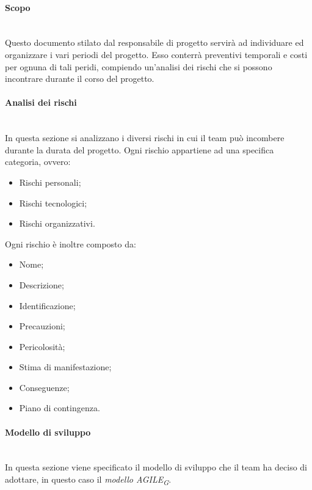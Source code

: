 \paragraph {Scopo}\mbox{}\\
Questo documento stilato dal responsabile di progetto servirà ad individuare ed organizzare i vari periodi del progetto. Esso conterrà preventivi temporali e costi per ognuna di tali peridi, compiendo un'analisi dei rischi che si possono incontrare durante il corso del progetto.
\paragraph {Analisi dei rischi}\mbox{}\\
In questa sezione si analizzano i diversi rischi in cui il team può incombere durante la durata del progetto.
Ogni rischio appartiene ad una specifica categoria, ovvero:
\begin{itemize}
	\item Rischi personali;
	\item Rischi tecnologici;
	\item Rischi organizzativi.
\end{itemize}
Ogni rischio è inoltre composto da:
\begin{itemize}
	\item Nome;
	\item Descrizione;
	\item Identificazione;
	\item Precauzioni;
	\item Pericolosità;
	\item Stima di manifestazione;
	\item Conseguenze;
	\item Piano di contingenza.
\end{itemize}
\paragraph {Modello di sviluppo}\mbox{}\\
In questa sezione viene specificato il modello di sviluppo che il team ha deciso di adottare, in questo caso il \textit{modello AGILE\textsubscript{G}}.
